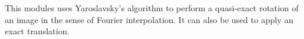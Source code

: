 This modules uses Yaroslavsky's algorithm to perform a quasi-exact
rotation of an image in the sense of Fourier interpolation. 
It can also be used to 
apply an exact translation.
